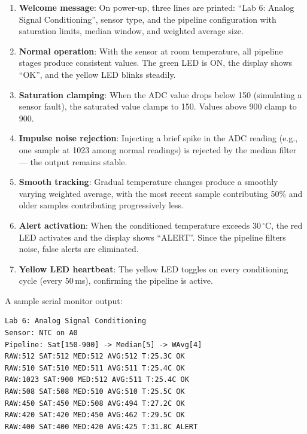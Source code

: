 \documentclass[12pt]{article}
\begin{document}
\begin{enumerate}
  \item \textbf{Welcome message}: On power-up, three lines are printed: ``Lab 6: Analog Signal Conditioning'', sensor type, and the pipeline configuration with saturation limits, median window, and weighted average size.

  \item \textbf{Normal operation}: With the sensor at room temperature, all pipeline stages produce consistent values. The green LED is ON, the display shows ``OK'', and the yellow LED blinks steadily.

  \item \textbf{Saturation clamping}: When the ADC value drops below 150 (simulating a sensor fault), the saturated value clamps to 150. Values above 900 clamp to 900.

  \item \textbf{Impulse noise rejection}: Injecting a brief spike in the ADC reading (e.g., one sample at 1023 among normal readings) is rejected by the median filter --- the output remains stable.

  \item \textbf{Smooth tracking}: Gradual temperature changes produce a smoothly varying weighted average, with the most recent sample contributing 50\% and older samples contributing progressively less.

  \item \textbf{Alert activation}: When the conditioned temperature exceeds 30\,$^{\circ}$C, the red LED activates and the display shows ``ALERT''. Since the pipeline filters noise, false alerts are eliminated.

  \item \textbf{Yellow LED heartbeat}: The yellow LED toggles on every conditioning cycle (every 50\,ms), confirming the pipeline is active.
\end{enumerate}

A sample serial monitor output:

\begin{lstlisting}
Lab 6: Analog Signal Conditioning
Sensor: NTC on A0
Pipeline: Sat[150-900] -> Median[5] -> WAvg[4]
RAW:512 SAT:512 MED:512 AVG:512 T:25.3C OK
RAW:510 SAT:510 MED:511 AVG:511 T:25.4C OK
RAW:1023 SAT:900 MED:512 AVG:511 T:25.4C OK
RAW:508 SAT:508 MED:510 AVG:510 T:25.5C OK
RAW:450 SAT:450 MED:508 AVG:494 T:27.2C OK
RAW:420 SAT:420 MED:450 AVG:462 T:29.5C OK
RAW:400 SAT:400 MED:420 AVG:425 T:31.8C ALERT
\end{lstlisting}
\end{document}
